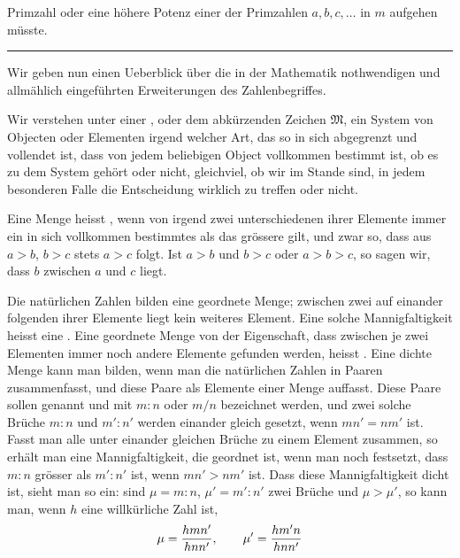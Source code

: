 Primzahl oder eine höhere Potenz einer der Primzahlen $a,b,c,\ldots$
in $m$ aufgehen müsste.

\begin{center}
\rule{0.18\linewidth}{0.4pt}
\end{center}

Wir geben nun einen Ueberblick über die in der Mathematik nothwendigen
und allmählich eingeführten Erweiterungen des Zahlenbegriffes.

Wir verstehen unter einer , oder
dem abkürzenden Zeichen $\mathfrak M$, ein System von Objecten oder
Elementen irgend welcher Art, das so in sich abgegrenzt und vollendet
ist, dass von jedem beliebigen Object vollkommen bestimmt ist, ob es
zu dem System gehört oder nicht, gleichviel, ob wir im Stande sind, in
jedem besonderen Falle die Entscheidung wirklich zu treffen oder nicht.

Eine Menge heisst , wenn von irgend zwei
unterschiedenen ihrer Elemente immer ein in sich vollkommen bestimmtes
als das grössere gilt, und zwar so, dass aus $a>b$, $b>c$ stets $a>c$
folgt. Ist $a>b$ und $b>c$ oder $a>b>c$, so sagen wir, dass $b$ zwischen
$a$ und $c$ liegt.%

Die natürlichen Zahlen bilden eine geordnete Menge; zwischen zwei auf
einander folgenden ihrer Elemente liegt kein weiteres Element. Eine
solche Mannigfaltigkeit heisst eine . Eine geordnete
Menge von der Eigenschaft, dass zwischen je zwei Elementen immer noch
andere Elemente gefunden werden, heisst . Eine dichte
Menge kann man bilden, wenn man die natürlichen Zahlen in Paaren
zusammenfasst, und diese Paare als Elemente einer Menge auffasst. Diese
Paare sollen  genannt und mit $m:n$ oder $m/n$
bezeichnet werden, und zwei solche Brüche $m:n$ und $m':n'$ werden
einander gleich gesetzt, wenn $mn'=nm'$ ist. Fasst man alle unter
einander gleichen Brüche zu einem Element zusammen, so erhält man eine
Mannigfaltigkeit, die geordnet ist, wenn man noch festsetzt, dass $m:n$
grösser als $m':n'$ ist, wenn $mn'>nm'$ ist. Dass diese Mannigfaltigkeit
dicht ist, sieht man so ein: sind $\mu=m:n$, $\mu'=m':n'$ zwei Brüche
und $\mu>\mu'$, so kann man, wenn $h$ eine willkürliche Zahl ist,
\[
 \mu={hmn'\over hnn'},
 \qquad
 \mu'={hm'n\over hnn'}
\]
